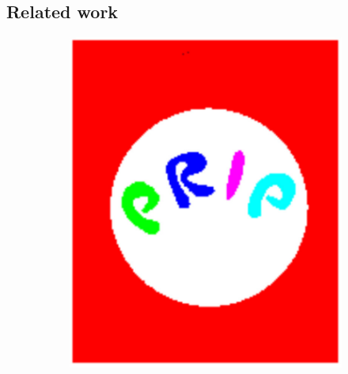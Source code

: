 \documentclass[12pt]{article}
\begin{document}
\subsection{Related work} %
\label{sub:related_work}

\begin{figure}[tb]
  \centering

  \begin{subfigure}[b]{0.25\textwidth}
        \includegraphics[width=\textwidth]{img/prip1}
        \caption{}\label{fig:prip1}
    \end{subfigure}
    ~
    \begin{subfigure}[b]{0.25\textwidth}

\end{subfigure}
\end{figure}
\end{document}
